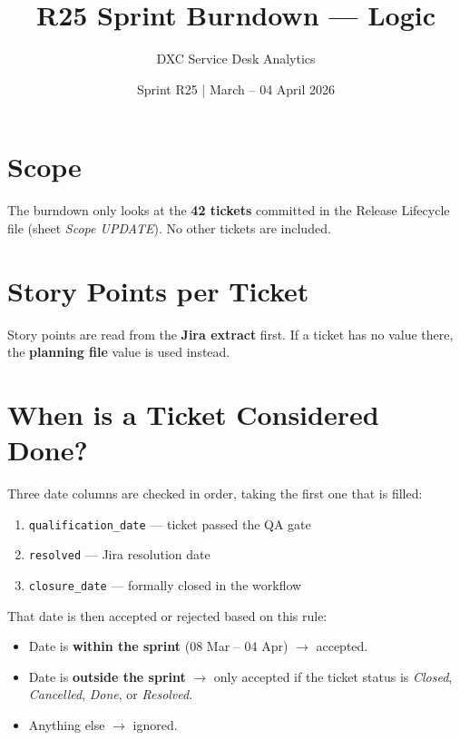 \documentclass[12pt, a4paper]{article}
\title{\textbf{R25 Sprint Burndown --- Logic}}
\author{DXC Service Desk Analytics}
\date{Sprint R25 \quad|\quad 08 March -- 04 April 2026}
\begin{document}
\maketitle

\section{Scope}

The burndown only looks at the \textbf{42 tickets} committed in the
Release Lifecycle file (sheet \emph{Scope UPDATE}). No other tickets are included.

\section{Story Points per Ticket}

Story points are read from the \textbf{Jira extract} first.
If a ticket has no value there, the \textbf{planning file} value is used instead.

\section{When is a Ticket Considered Done?}

Three date columns are checked in order, taking the first one that is filled:

\begin{enumerate}
  \item \texttt{qualification\_date} --- ticket passed the QA gate
  \item \texttt{resolved} --- Jira resolution date
  \item \texttt{closure\_date} --- formally closed in the workflow
\end{enumerate}

That date is then accepted or rejected based on this rule:

\begin{itemize}
  \item Date is \textbf{within the sprint} (08 Mar -- 04 Apr) $\rightarrow$ accepted.
  \item Date is \textbf{outside the sprint} $\rightarrow$ only accepted if the
        ticket status is \emph{Closed}, \emph{Cancelled}, \emph{Done}, or \emph{Resolved}.
  \item Anything else $\rightarrow$ ignored.
\end{itemize}
\end{document}
